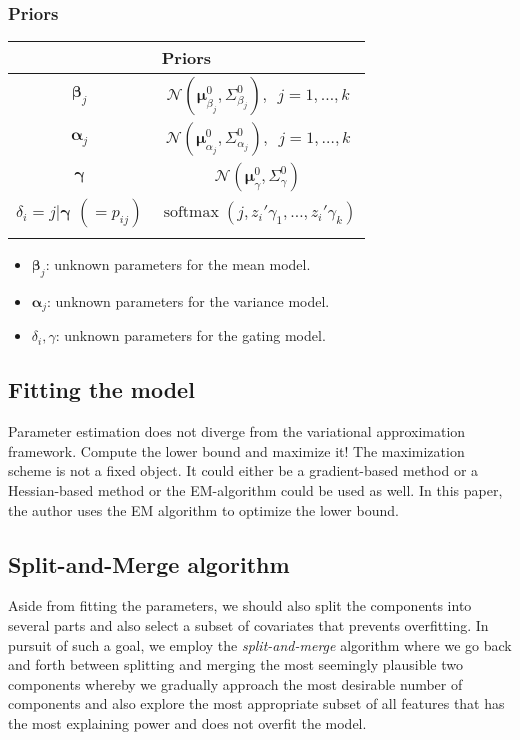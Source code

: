 \documentclass[11pt]{article}
\newcommand{\bs}{\boldsymbol}
\newcommand{\opn}{\operatorname}
\begin{document}
\subsubsection{Priors}
\begin{table}[!htbp]
\centering
  \begin{tabular}{*2c}
    \toprule
    \multicolumn{2}{c}{\textbf{Priors}}\\
    \midrule
    $\bs{\beta}_{j}$& $\mathcal{N}\left(\bs{\mu}_{\beta_{j}}^{0}, \Sigma_{\beta_{j}}^{0} \right), \,\,\, j = 1, \ldots, k$\\
    \midrule
    $\bs{\alpha}_{j}$ & $\mathcal{N}\left(\bs{\mu}_{\alpha_{j}}^{0}, \Sigma_{\alpha_{j}}^{0} \right),\,\,\, j=1,\ldots, k $\\
    \midrule
    $\bs{\gamma}$ & $\mathcal{N}\left(\bs{\mu}_{\gamma}^{0}, \Sigma_{\gamma}^{0} \right) $\\
    \midrule
    $\delta_{i}=j|\bs{\gamma}\,\,(=p_{ij})$ & $\opn{softmax}\left(j, z_{i}'\gamma_{1}, \ldots , z_{i}'\gamma_{k} \right)$\\
    \bottomrule\\
  \end{tabular}
\end{table}
\begin{itemize}
  \item $\bs{\beta}_{j}$: unknown parameters for the mean model.
  \item $\bs{\alpha}_{j}$: unknown parameters for the variance model.
  \item $\delta_{i}, \gamma$: unknown parameters for the gating model.
\end{itemize}
\subsection{Fitting the model}
Parameter estimation does not diverge from the variational approximation framework. Compute the lower bound and maximize it! The maximization scheme is not a fixed object. It could either be a gradient-based method or a Hessian-based method or the EM-algorithm could be used as well. In this paper, the author uses the EM algorithm to optimize the lower bound.
\subsection{Split-and-Merge algorithm}
Aside from fitting the parameters, we should also split the components into several parts and also select a subset of covariates that prevents overfitting. In pursuit of such a goal, we employ the \emph{split-and-merge} algorithm where we go back and forth between splitting and merging the most seemingly plausible two components whereby we gradually approach the most desirable number of components and also explore the most appropriate subset of all features that has the most explaining power and does not overfit the model.
\end{document}
